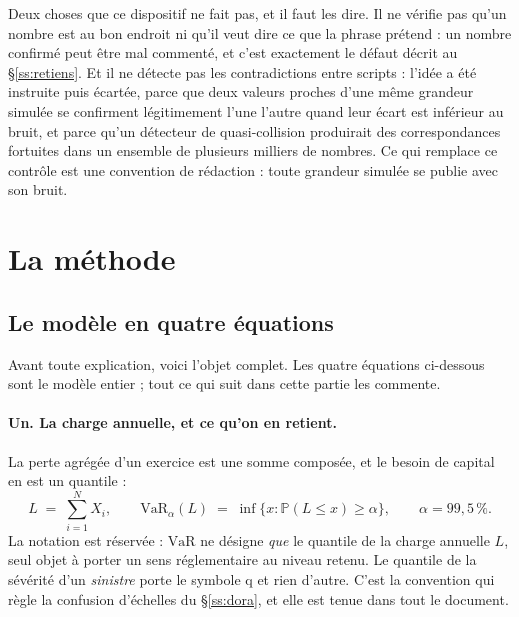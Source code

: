 \documentclass[12pt,a4paper]{article}
\theoremstyle{definition}
\begin{document}
Deux choses que ce dispositif ne fait pas, et il faut les dire. Il ne vérifie pas
qu'un nombre est au bon endroit ni qu'il veut dire ce que la phrase prétend : un
nombre confirmé peut être mal commenté, et c'est exactement le défaut décrit au
\S\ref{ss:retiens}. Et il ne détecte pas les contradictions entre scripts : l'idée
a été instruite puis écartée, parce que deux valeurs proches d'une même grandeur
simulée se confirment légitimement l'une l'autre quand leur écart est inférieur au
bruit, et parce qu'un détecteur de quasi-collision produirait des correspondances
fortuites dans un ensemble de plusieurs milliers de nombres. Ce qui remplace ce
contrôle est une convention de rédaction : toute grandeur simulée se publie avec
son bruit.

\section{La méthode}
\label{s:methode}

\subsection{Le modèle en quatre équations}
\label{ss:equations}

Avant toute explication, voici l'objet complet. Les quatre équations ci-dessous
sont le modèle entier ; tout ce qui suit dans cette partie les commente.

\paragraph{Un. La charge annuelle, et ce qu'on en retient.} La perte agrégée d'un
exercice est une somme composée, et le besoin de capital en est un quantile :
\begin{equation}
  L \;=\; \sum_{i=1}^{N} X_i,
  \qquad
  \mathrm{VaR}_{\alpha}(L) \;=\; \inf\bigl\{x : \mathbb{P}(L \le x) \ge \alpha \bigr\},
  \qquad \alpha = 99{,}5\,\%.
  \label{eq:charge}
\end{equation}
La notation est réservée : $\mathrm{VaR}$ ne désigne \emph{que} le quantile de la
charge annuelle $L$, seul objet à porter un sens réglementaire au niveau retenu. Le
quantile de la sévérité d'un \emph{sinistre} porte le symbole $\mathrm{q}$ et rien
d'autre. C'est la convention qui règle la confusion d'échelles du
\S\ref{ss:dora}, et elle est tenue dans tout le document.
\end{document}
